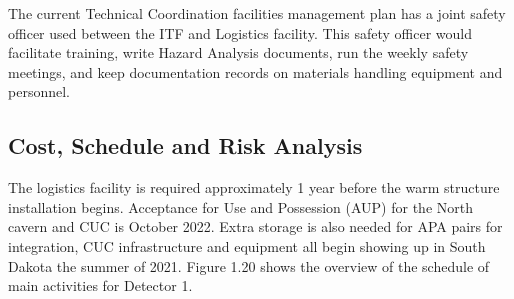 The current Technical Coordination facilities management plan has a joint safety officer used between the ITF and Logistics facility. This safety officer would facilitate training, write Hazard Analysis documents, run the weekly safety meetings, and keep documentation records on materials handling equipment and personnel. 


\subsection{Cost, Schedule and Risk Analysis}
\label{sec:fdsp-tc-log-cost}



The logistics facility is required approximately 1 year before the warm structure installation begins.  Acceptance for Use and Possession (AUP) for the North cavern and CUC is October 2022.  Extra storage is also needed for APA pairs for integration, CUC infrastructure and equipment all begin showing up in  South Dakota the summer of 2021. Figure 1.20 shows the overview of the schedule of main activities for Detector 1.

